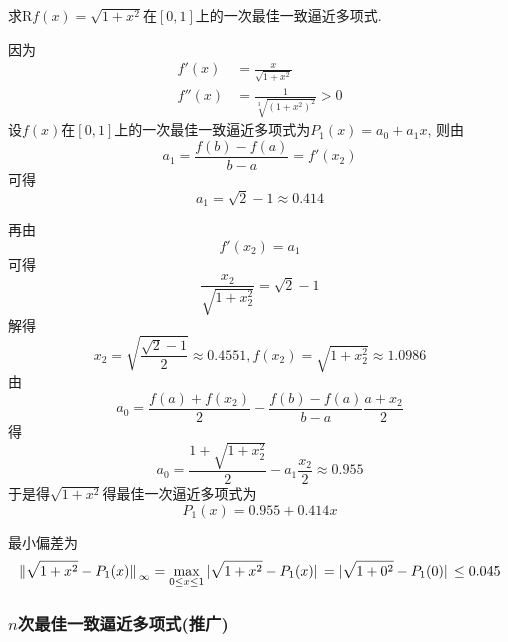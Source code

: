 \begin{example}
    求R$f(x)=\sqrt{1+x^2}$在$[0,1]$上的一次最佳一致逼近多项式.
\end{example}
\begin{solution}
    因为
    \begin{align*}
        f'(x)&=\frac{x}{\sqrt{1+x^2}}\\
        f''(x)&=\frac{1}{\sqrt[3]{(1+x^2)^2}}>0
    \end{align*}
    设$f(x)$在$[0,1]$上的一次最佳一致逼近多项式为$P_1(x)=a_0+a_1x$, 则由
    \begin{equation*}
        a_1=\frac{f(b)-f(a)}{b-a}=f'(x_2)
    \end{equation*}
    可得
    \begin{equation*}
        a_1=\sqrt{2}-1\approx0.414
    \end{equation*}

    再由
    \begin{equation*}
        f'(x_2)=a_1
    \end{equation*}
    可得
    \begin{equation*}
        \frac{x_2}{\sqrt{1+x_2^2}}=\sqrt{2}-1
    \end{equation*}
    解得
    \begin{equation*}
        x_2=\sqrt{\frac{\sqrt{2}-1}{2}}\approx0.4551, f(x_2)=\sqrt{1+x_2^2}\approx1.0986
    \end{equation*}
    由
    \begin{equation*}
        a_0=\frac{f(a)+f(x_2)}{2}-\frac{f(b)-f(a)}{b-a}\frac{a+x_2}{2}
    \end{equation*}
    得
    \begin{equation*}
        a_0=\frac{1+\sqrt{1+x_2^2}}{2}-a_1\frac{x_2}{2}\approx0.955
    \end{equation*}
    于是得$\sqrt{1+x^2}$得最佳一次逼近多项式为
    \begin{equation*}
        P_1(x)=0.955+0.414x
    \end{equation*}

    最小偏差为
    \begin{equation*}
        \norm*{\sqrt{1+x^2}-P_1(x)}_\infty=\max_{0\le x\le1}\abs*{\sqrt{1+x^2}-P_1(x)}=\abs*{\sqrt{1+0^2}-P_1(0)}\le0.045
    \end{equation*}
\end{solution}

\subsubsection{$n$次最佳一致逼近多项式(推广)}

